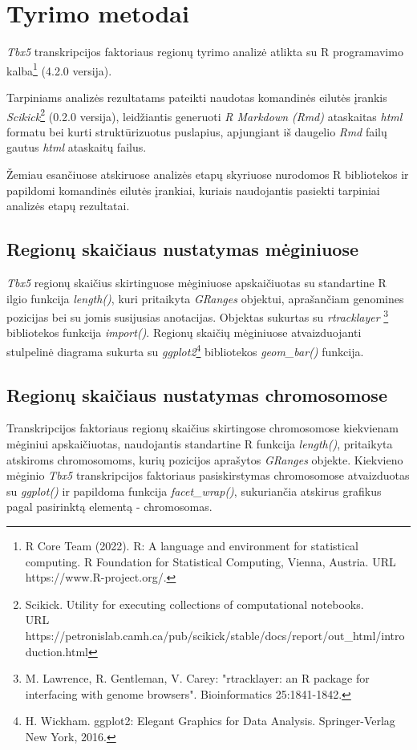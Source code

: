 \documentclass[12pt]{article}
\begin{document}

\section{Tyrimo metodai}
\emph{Tbx5} transkripcijos faktoriaus regionų tyrimo analizė atlikta
su R programavimo kalba\footnote{R Core Team (2022).
R: A language and environment for statistical computing. R Foundation
for Statistical Computing, Vienna, Austria. URL https://www.R-project.org/.}
(4.2.0 versija).

Tarpiniams analizės rezultatams pateikti naudotas komandinės eilutės
įrankis \emph{Scikick}\footnote{Scikick. Utility for executing collections
of computational notebooks. \\URL https://petronislab.camh.ca/pub/scikick/stable/docs/report/out\_html/introduction.html}
(0.2.0 versija), leidžiantis generuoti \emph{R Markdown (Rmd)} ataskaitas
\emph{html} formatu bei kurti struktūrizuotus puslapius, apjungiant
iš daugelio \emph{Rmd} failų gautus \emph{html} ataskaitų failus.

Žemiau esančiuose atskiruose analizės etapų skyriuose
nurodomos R bibliotekos ir papildomi komandinės eilutės įrankiai, kuriais
naudojantis pasiekti tarpiniai analizės etapų rezultatai.

\subsection{Regionų skaičiaus nustatymas mėginiuose}
\emph{Tbx5} regionų skaičius skirtinguose mėginiuose apskaičiuotas
su standartine R ilgio funkcija \emph{length()}, kuri pritaikyta
\emph{GRanges} objektui, aprašančiam genomines pozicijas bei su jomis
susijusias anotacijas. Objektas sukurtas su \emph{rtracklayer}
\footnote{M. Lawrence, R. Gentleman, V. Carey: "rtracklayer: an {R} package for
interfacing with genome browsers". Bioinformatics 25:1841-1842.}
bibliotekos funkcija \emph{import()}.
Regionų skaičių mėginiuose atvaizduojanti stulpelinė diagrama
sukurta su \emph{ggplot2}\footnote{H. Wickham. ggplot2: Elegant
Graphics for Data Analysis. Springer-Verlag New York, 2016.}
bibliotekos \emph{geom\_bar()} funkcija.

\subsection{Regionų skaičiaus nustatymas chromosomose}
Transkripcijos faktoriaus regionų skaičius skirtingose chromosomose
kiekvienam mėginiui apskaičiuotas, naudojantis standartine R
funkcija \emph{length()}, pritaikyta atskiroms chromosomoms,
kurių pozicijos aprašytos \emph{GRanges} objekte.
Kiekvieno mėginio \emph{Tbx5} transkripcijos faktoriaus pasiskirstymas
chromosomose atvaizduotas su \emph{ggplot()} ir papildoma funkcija
\emph{facet\_wrap()}, sukuriančia atskirus grafikus pagal pasirinktą
elementą - chromosomas.
\end{document}
